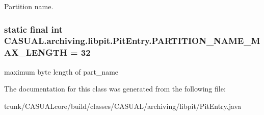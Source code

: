 Partition name. \hypertarget{class_c_a_s_u_a_l_1_1archiving_1_1libpit_1_1_pit_entry_af13f15acef20a1165f8a5dafd4f226c3}{
\subsubsection[{P\-A\-R\-T\-I\-T\-I\-O\-N\-\_\-\-N\-A\-M\-E\-\_\-\-M\-A\-X\-\_\-\-L\-E\-N\-G\-T\-H}]{\setlength{\rightskip}{0pt plus 5cm}static final int C\-A\-S\-U\-A\-L.\-archiving.\-libpit.\-Pit\-Entry.\-P\-A\-R\-T\-I\-T\-I\-O\-N\-\_\-\-N\-A\-M\-E\-\_\-\-M\-A\-X\-\_\-\-L\-E\-N\-G\-T\-H = 32\hspace{0.3cm}{\ttfamily [static]}}}\label{class_c_a_s_u_a_l_1_1archiving_1_1libpit_1_1_pit_entry_af13f15acef20a1165f8a5dafd4f226c3}
maximum byte length of part\-\_\-name 

The documentation for this class was generated from the following file\-:\begin{DoxyCompactItemize}
\item 
trunk/\-C\-A\-S\-U\-A\-Lcore/build/classes/\-C\-A\-S\-U\-A\-L/archiving/libpit/Pit\-Entry.\-java\end{DoxyCompactItemize}
